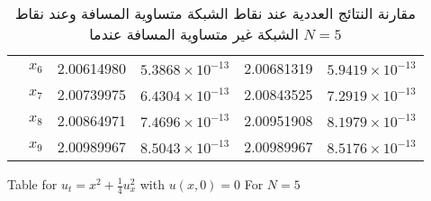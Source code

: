 \begin{table}[ht]
\begin{english}
\begin{tabular}{|c|c|c|c|c|c|}
			& \( x_6 \) & 2.00614980 & \( 5.3868 \times 10^{-13} \) & 2.00681319 & \( 5.9419 \times 10^{-13} \) \\
			& \( x_7 \) & 2.00739975 & \( 6.4304 \times 10^{-13} \) & 2.00843525 & \( 7.2919 \times 10^{-13} \) \\
			& \( x_8 \) & 2.00864971 & \( 7.4696 \times 10^{-13} \) & 2.00951908 & \( 8.1979 \times 10^{-13} \) \\
			& \( x_9 \) & 2.00989967 & \( 8.5043 \times 10^{-13} \) & 2.00989967 & \( 8.5176 \times 10^{-13} \) \\
			\hline
		\end{tabular}
\end{english}
	\caption{\centering مقارنة النتائج العددية عند نقاط الشبكة متساوية المسافة وعند نقاط الشبكة غير متساوية المسافة عندما $N=5$}
\label{tab:secondN9}
\end{table}
	
	Table for \( u_{t} = x^2 + \frac{1}{4} u_{x}^2 \) with \( u(x,0) = 0 \)
	For \( N = 5 \)
	
